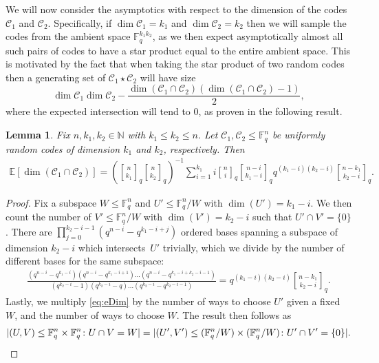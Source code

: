 \documentclass[a4paper,11pt,reqno]{article}
\newcommand{\F}{\mathbb{F}}
\newcommand{\C}{\mathcal{C}}
\newcommand{\qbinom}[2]{\genfrac[]{0pt}{0}{#1}{#2}}
\theoremstyle{plain} \numberwithin{equation}{section}
\newtheorem{Lemma}[theorem]{Lemma}
\theoremstyle{definition}
\begin{document}
We will now consider the asymptotics with respect to the dimension of the codes $\C_1$ and $\C_2$. Specifically, if $\dim \C_1 = k_1$ and $\dim \C_2 = k_2$ then we will sample the codes from the ambient space $\F_q^{k_1 k_2}$, as we then expect asymptotically almost all such pairs of codes to have a star product equal to the entire ambient space. This is motivated by the fact that when taking the star product of two random codes then a generating set of $\C_1 \star \C_2$ will have size
\[ \dim\C_1\dim \C_2 - \frac{\dim(\C_1\cap \C_2) (\dim(\C_1\cap \C_2)-1)}{2},\]
where the expected intersection will tend to 0, as proven in the following result.

\begin{Lemma} \label{lemma:expectedintersection}
Fix $n,k_1,k_2\in \mathbb{N}$ with $k_1\leq k_2\leq n$. Let $\C_1,\C_2\leq \F_q^n$ be uniformly random codes of dimension $k_1$ and $k_2$, respectively. Then
\begin{align*}
\mathbb{E}[\dim(\C_1 \cap \C_2)] = \left( {{\qbinom{n}{k_1}_q\qbinom{n}{k_2}_q}}\right)^{-1}{{\sum\limits^{k_1}_{i = 1} i\qbinom{n}{i}_q \qbinom{n-i}{k_1-i}_q q^{(k_1-i)(k_2-i)} \qbinom{n-k_1}{k_2-i}_q}}. 
\end{align*}
\end{Lemma}
\begin{proof}
Fix a subspace $W\leq \F_q^n$ and $U'\leq \F_q^n/W$ with $\dim (U') = k_1-i$. We then count the number of $V' \leq \F_q^n/W$ with $\dim(V') = k_2-i$ such that $U'\cap V' = \{0\}$. There are $\prod^{k_2-i-1}_{j=0}(q^{n-i}-q^{k_1-i+j})$ ordered bases spanning a subspace of dimension $k_2-i$ which intersects~$U'$ trivially, which we divide by the number of different bases for the same subspace:
\begin{align}
\frac{(q^{n-i}-q^{k_1-i})(q^{n-i}-q^{k_1-i+1})\ldots(q^{n-i}-q^{k_1-i+k_2-i-1})}{(q^{k_2-i}-1)(q^{k_2-i}-q)\ldots(q^{k_2-i}-q^{k_2-i-1})} = q^{(k_1-i)(k_2-i)}\qbinom{n-k_1}{k_2-i}_q. \label{eq:eDim}
\end{align}
Lastly, we multiply \eqref{eq:eDim} by the number of ways to choose $U'$ given a fixed $W$, and the number of ways to choose $W$. The result then follows as
\begin{equation*}
    |(U,V)\leq \F_q^n \times \F_q^n \colon U\cap V = W|= |(U',V')\leq (\F_q^n /W) \times (\F_q^n/ W) \colon U'\cap V' = \{0\}|.\qedhere
\end{equation*} 
\end{proof}
\end{document}
